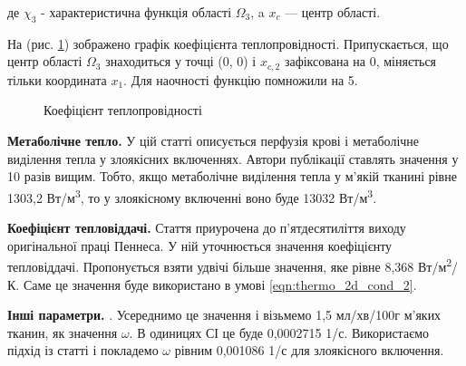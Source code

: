 \noindent де $\chi_3$ - характеристична функція області $\Omega_3$, a $x_c$ --- центр області.

\noindent На (рис. \ref{fig:thermo_2d_thermal_conductivity}) зображено графік коефіцієнта теплопровідності. 
Припускається, що центр області $\Omega_3$ знаходиться у точці (0, 0) і $x_{c,2}$ зафіксована на 0, міняється тільки 
координата $x_1$. Для наочності функцію помножили на 5. 

\begin{figure}[ht!]
    \centering
    \caption{Коефіцієнт теплопровідності}
    \label{fig:thermo_2d_thermal_conductivity}
\end{figure}

\textbf{Метаболічне тепло.} У цій статті \cite{metabolic-heat-exchange-value-tumor} описується перфузія крові і 
метаболічне виділення тепла у злоякісних включеннях. Автори публікації ставлять значення у 10 разів вищим. Тобто, якщо 
метаболічне виділення тепла у м'якій тканині рівне 1303,2 Вт/м\textsuperscript{3}, то у злоякісному включенні воно буде 
13032 Вт/м\textsuperscript{3}.

\textbf{Коефіцієнт тепловіддачі.} Стаття \cite{thermal-process-tissue-pennes-explained} приурочена до п'ятдесятиліття 
виходу оригінальної праці Пеннеса. У ній уточнюється значення коефіцієнту тепловіддачі. Пропонується взяти удвічі більше 
значення, яке рівне 8,368 Вт/м\textsuperscript{2}/К. Саме це значення буде використано в умові 
\ref{eqn:thermo_2d_cond_2}.

\textbf{Інші параметри.} \cite[Пеннес змоделював руку як довгий цилінд і обчислив стаціонарний розроділ температури. 
У його моделі не можна було просто виміряти перфузію крові через м'які тканини $\omega$, тому Пеннес узгодив цей 
параметр із експерементальними даними для фіксованої температури навколишнього середовища і метаболічного виділення 
тепла. Він отримав значення перфузії крові $\omega$ між 1,2 і 1,8 мл/хв/100г м'яких тканин, що є типовими діапазоном 
значень для м'язів людської руки у стані спокою]{kutz-zhu-heat-transfer-biological-systems}. Усереднимо це значення і 
візьмемо 1,5 мл/хв/100г м'яких тканин, як значення $\omega$. В одиницях СІ це буде 0,0002715 1/с. Використаємо підхід
із статті \cite{metabolic-heat-exchange-value-tumor} і покладемо $\omega$ рівним 0,001086 1/с для злоякісного включення.

